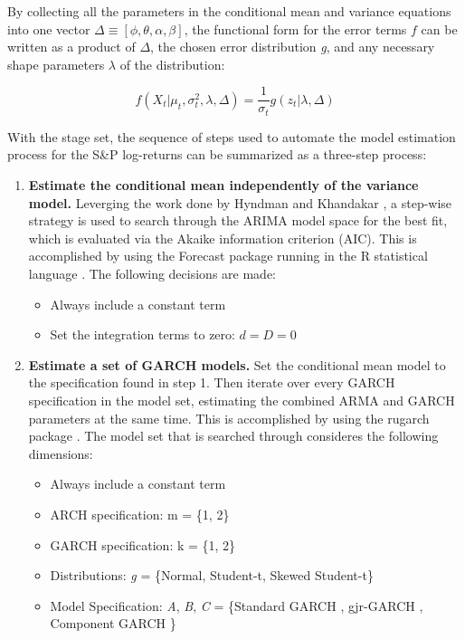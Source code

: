 \documentclass[12pt]{article}
\begin{document}
By collecting all the parameters in the conditional mean and variance equations into one vector $\Delta \equiv [\phi, \theta, \alpha, \beta]$, the functional form for the error terms $f$ can be written as a product of $\Delta$, the chosen error distribution \emph{g}, and any necessary shape parameters \emph{$\lambda$} of the distribution:

\begin{equation}
    f(X_{t} | \mu_{t}, \sigma^{2}_{t}, \lambda, \Delta) = \frac{1}{\sigma_{t}} g(z_{t} | \lambda, \Delta)
\end{equation}

With the stage set, the sequence of steps used to automate the model estimation process for the S\&P log-returns can be summarized as a three-step process:

\begin{enumerate}
    \item \textbf{Estimate the conditional mean independently of the variance model.} Leverging the work done by Hyndman and Khandakar \cite{HyndmanKhandakar2008AutoArima}, a step-wise strategy is used to search through the ARIMA model space for the best fit, which is evaluated via the Akaike information criterion (AIC). This is accomplished by using the Forecast package \cite{RForecast} running in the R statistical language \cite{RBase}. The following decisions are made: 
    
    \begin{itemize}
        \item Always include a constant term
        \item Set the integration terms to zero: $d = D = 0$
    \end{itemize}
    
    \item \textbf{Estimate a set of GARCH models.} Set the conditional mean model to the specification found in step 1. Then iterate over every GARCH specification in the model set, estimating the combined ARMA and GARCH parameters at the same time. This is accomplished by using the rugarch package \cite{Rugarch}. The model set that is searched through consideres the following dimensions:
    
    \begin{itemize}
        \item Always include a constant term
        \item ARCH specification: m = \{1, 2\}
        \item GARCH specification: k = \{1, 2\}
        \item Distributions: \emph{g} = \{Normal, Student-t, Skewed Student-t\}
        \item Model Specification: \emph{A}, \emph{B}, \emph{C} = \{Standard GARCH \cite{Bollerslev1986Garch}, gjr-GARCH \cite{GJR1993Garch}, Component GARCH \cite{EngleLee1993APA} \}
    \end{itemize}
    

\end{enumerate}
\end{document}
